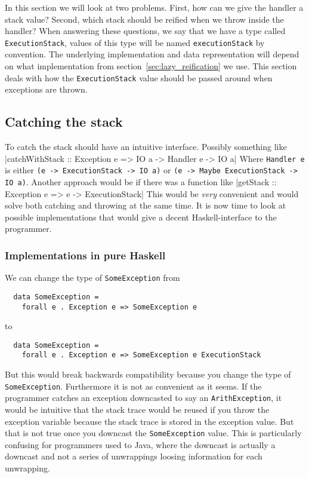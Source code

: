 In this section we will look at two problems. First, how can we give
the handler a stack value? Second, which stack should be reified
when we throw inside the handler? When answering these questions, we
say that we have a type called \texttt{ExecutionStack}, values of
this type will be named \texttt{executionStack} by convention. The
underlying implementation and data representation will depend on what
implementation from section~\ref{sec:lazy_reification} we use. This section
deals with how the \texttt{ExecutionStack} value should be passed around
when exceptions are thrown.

\subsection{Catching the stack}

To catch the stack should have an intuitive interface. Possibly
something like
|catchWithStack :: Exception e => IO a -> Handler e -> IO a|
Where \texttt{Handler e} is either \texttt{(e -> ExecutionStack -> IO a)} or
\texttt{(e -> Maybe ExecutionStack -> IO a)}. Another approach would be
if there was a function like
|getStack :: Exception e => e -> ExecutionStack|
This would be \emph{very} convenient and would solve both catching and
throwing at the same time. It is now time to look at possible
implementations
that would give a decent Haskell-interface to the programmer.

\subsubsection{Implementations in pure Haskell}

We can change the type of \texttt{SomeException} from

\begin{verbatim}
  data SomeException =
    forall e . Exception e => SomeException e
\end{verbatim}

to

\begin{verbatim}
  data SomeException =
    forall e . Exception e => SomeException e ExecutionStack
\end{verbatim}

But this would break backwards compatibility because you change the type
of \texttt{SomeException}. Furthermore it is not as convenient as it
seems. If the programmer catches an exception downcasted to say an
\texttt{ArithException}, it would be intuitive that the stack trace
would be reused if you throw the exception variable because the stack
trace is stored in the exception value. But that is not true once you
downcast the \texttt{SomeException} value. This is particularly confusing for
programmers used to Java, where the downcast is actually a downcast and
not a series of unwrappings loosing information for each unwrapping.

